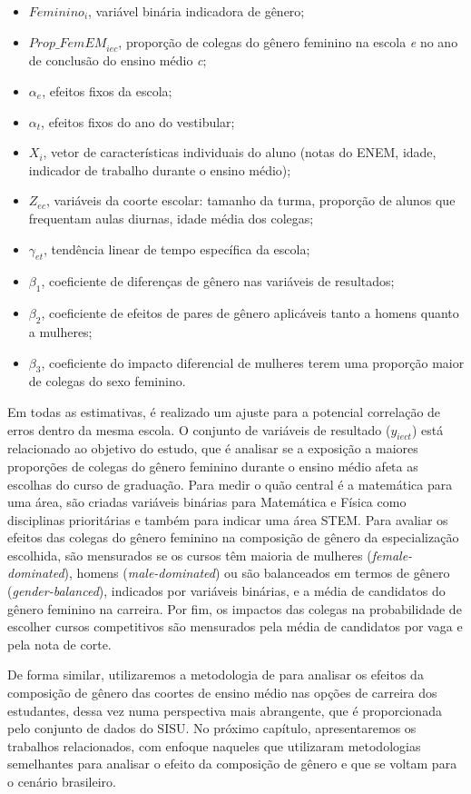\begin{itemize}
  \item $\textit{Feminino}_i$, variável binária indicadora de gênero;
  \item $\textit{Prop\_FemEM}_{iec}$, proporção de colegas do gênero feminino na escola \textit{e} no ano de conclusão do ensino médio \textit{c};
  \item $\alpha_e$, efeitos fixos da escola;
  \item $\alpha_t$, efeitos fixos do ano do vestibular;
  \item $X_i$, vetor de características individuais do aluno (notas do ENEM, idade, indicador de trabalho durante o ensino médio);
  \item $Z_{ec}$, variáveis da coorte escolar: tamanho da turma, proporção de alunos que frequentam aulas diurnas, idade média dos colegas;
  \item $\gamma_{et}$, tendência linear de tempo específica da escola;
  \item $\beta_1$, coeficiente de diferenças de gênero nas variáveis de resultados;
  \item $\beta_2$, coeficiente de efeitos de pares de gênero aplicáveis tanto a homens quanto a mulheres;
  \item $\beta_3$, coeficiente do impacto diferencial de mulheres terem uma proporção maior de colegas do sexo feminino.
\end{itemize}

Em todas as estimativas, é realizado um ajuste para a potencial correlação de erros dentro da mesma escola. O conjunto de variáveis de resultado ($y_{iect}$) está relacionado ao objetivo do estudo, que é analisar se a exposição a maiores proporções de colegas do gênero feminino durante o ensino médio afeta as escolhas do curso de graduação. Para medir o quão central é a matemática para uma área, são criadas variáveis binárias para Matemática e Física como disciplinas prioritárias e também para indicar uma área STEM. Para avaliar os efeitos das colegas do gênero feminino na composição de gênero da especialização escolhida, são mensurados se os cursos têm maioria de mulheres (\textit{female-dominated}), homens (\textit{male-dominated}) ou são balanceados em termos de gênero (\textit{gender-balanced}), indicados por variáveis binárias, e a média de candidatos do gênero feminino na carreira. Por fim, os impactos das colegas na probabilidade de escolher cursos competitivos são mensurados pela média de candidatos por vaga e pela nota de corte.

De forma similar, utilizaremos a metodologia de \citet{Borges2021} para analisar os efeitos da composição de gênero das coortes de ensino médio nas opções de carreira dos estudantes, dessa vez numa perspectiva mais abrangente, que é proporcionada pelo conjunto de dados do SISU. No próximo capítulo, apresentaremos os trabalhos relacionados, com enfoque naqueles que utilizaram metodologias semelhantes para analisar o efeito da composição de gênero e que se voltam para o cenário brasileiro.